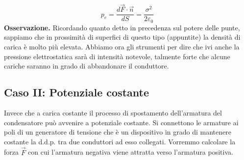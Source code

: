 \[
	p_e = \frac{d\vec{F} \cdot \vec{n}}{dS} = \frac{\sigma^2}{2\varepsilon_0}
\]
\textbf{Osservazione.} Ricordando quanto detto in precedenza sul potere delle punte, sappiamo che in prossimità di superfici di questo tipo (appuntite) la densità di carica è molto più elevata. Abbiamo ora gli strumenti per dire che ivi anche la pressione elettrostatica sarà di intensità notevole, talmente forte che alcune cariche saranno in grado di abbandonare il conduttore.

\subsection{Caso II: Potenziale costante}

Invece che a carica costante il processo di spostamento dell'armatura del condensatore può avvenire a potenziale costante. Si connettono le armature ai poli di un generatore di tensione che è un dispositivo in grado di mantenere costante la d.d.p. tra due conduttori ad esso collegati. Vorremmo calcolare la forza $\vec{F}$ con cui l'armatura negativa viene attratta verso l'armatura positiva.

